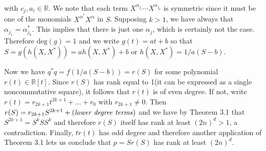 \documentclass[11pt]{amsart}
\begin{document}
with $c_j,a_i \in \mathbb{R}$. We note that each term $X^{\alpha_{j_1}}\cdots X^{\alpha_{j_k}}$ is symmetric since it must be one of the monomials $X^{\alpha^*}X^\alpha$ in $S$. Supposing $k>1$, we have always that $\alpha_{j_1}=\alpha_{j_k}^*$. This implies that there is just one $\alpha_j$, which is certainly not the case.  Therefore $\text{deg}(g)=1$ and we write $g(t)=at+b$ so that $S=g(h(X,X^*))=ah(X,X^*)+b$ or $h(X,X^*)=1\slash a(S-b)$.

Now we have $q^*q=f(1\slash a (S-b))=r(S)$ for some polynomial $r(t)\in \mathbb{R}[t]$.  Since $r(S)$ has rank equal to 1(it can be expressed as a single noncommutative square), it follows that $r(t)$ is of even degree.  If not, write $r(t)=r_{2k+1}t^{2k+1}+\ldots +r_0$ with $r_{2k+1}\neq0$. Then $r(S)=r_{2k+1}S^{2k+1}+(\text{\emph{lower degree terms}})$ and we have by Theorem 3.1 that $S^{2k+1}=S^kSS^k$ and therefore $r(S)$ itself has rank at least $(2n)^d>1$, a contradiction.  Finally, $tr(t)$ has odd degree and therefore another application of Theorem 3.1 lets us conclude that $p=Sr(S)$ has rank at least $(2n)^d$.\endproof 






  
\end{document}
